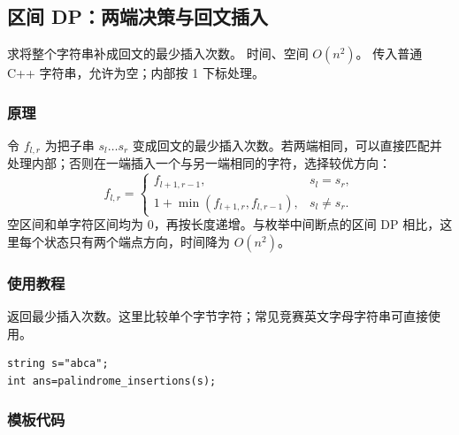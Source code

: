 \subsection{区间 DP：两端决策与回文插入}
\label{dp:interval-ends}
\AlgorithmInfo
    {求将整个字符串补成回文的最少插入次数。}
    {时间、空间 $O(n^2)$。}
    {传入普通 C++ 字符串，允许为空；内部按 1 下标处理。}
\subsubsection*{原理}

令 $f_{l,r}$ 为把子串 $s_l\ldots s_r$ 变成回文的最少插入次数。若两端相同，可以直接匹配并处理内部；否则在一端插入一个与另一端相同的字符，选择较优方向：
\[
 f_{l,r}=\begin{cases}
 f_{l+1,r-1},&s_l=s_r,\\
 1+\min(f_{l+1,r},f_{l,r-1}),&s_l\ne s_r.
 \end{cases}
\]
空区间和单字符区间均为 0，再按长度递增。与枚举中间断点的区间 DP 相比，这里每个状态只有两个端点方向，时间降为 $O(n^2)$。

\subsubsection*{使用教程}
 返回最少插入次数。这里比较单个字节字符；常见竞赛英文字母字符串可直接使用。
\begin{lstlisting}[style=mtycpp,numbers=none]
string s="abca";
int ans=palindrome_insertions(s);
\end{lstlisting}
\subsubsection*{模板代码}
